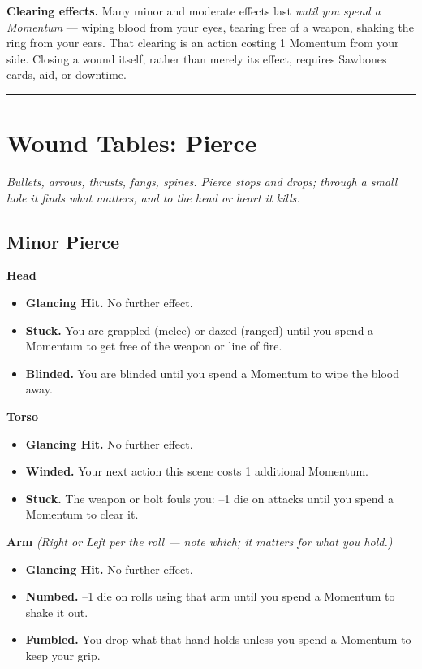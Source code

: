 \textbf{Clearing effects.} Many minor and moderate effects last \textit{until you spend a Momentum} --- wiping blood from your eyes, tearing free of a weapon, shaking the ring from your ears. That clearing is an action costing 1 Momentum from your side. Closing a wound itself, rather than merely its effect, requires Sawbones cards, aid, or downtime.

\medskip\hrule\medskip

\section{Wound Tables: Pierce}

\textit{Bullets, arrows, thrusts, fangs, spines. Pierce stops and drops; through a small hole it finds what matters, and to the head or heart it kills.}

\subsection{Minor Pierce}

\textbf{Head}
\begin{itemize}
    \item[1--2] \textbf{Glancing Hit.} No further effect.
    \item[3] \textbf{Stuck.} You are grappled (melee) or dazed (ranged) until you spend a Momentum to get free of the weapon or line of fire.
    \item[4] \textbf{Blinded.} You are blinded until you spend a Momentum to wipe the blood away.
\end{itemize}

\textbf{Torso}
\begin{itemize}
    \item[1--2] \textbf{Glancing Hit.} No further effect.
    \item[3] \textbf{Winded.} Your next action this scene costs 1 additional Momentum.
    \item[4] \textbf{Stuck.} The weapon or bolt fouls you: --1 die on attacks until you spend a Momentum to clear it.
\end{itemize}

\textbf{Arm} \textit{(Right or Left per the roll --- note which; it matters for what you hold.)}
\begin{itemize}
    \item[1--2] \textbf{Glancing Hit.} No further effect.
    \item[3] \textbf{Numbed.} --1 die on rolls using that arm until you spend a Momentum to shake it out.
    \item[4] \textbf{Fumbled.} You drop what that hand holds unless you spend a Momentum to keep your grip.
\end{itemize}

